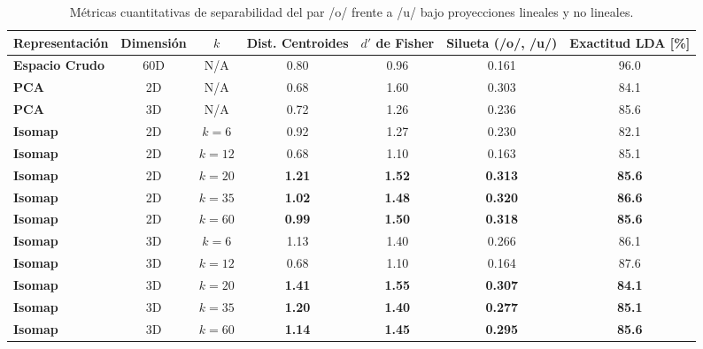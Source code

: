 \documentclass[11pt,a4paper,openany]{book}
\theoremstyle{definition}
\begin{document}
\begin{table}[H]
\centering
\small
\begin{tabular}{lcccccc}
\toprule
\textbf{Representación} & \textbf{Dimensión} & \textbf{$k$} & \textbf{Dist. Centroides} & \textbf{$d'$ de Fisher} & \textbf{Silueta (/o/, /u/)} & \textbf{Exactitud LDA [\%]} \\
\midrule
\textbf{Espacio Crudo} & 60D & N/A & 0.80 & 0.96 & 0.161 & 96.0 \\
\textbf{PCA}           & 2D  & N/A & 0.68 & 1.60 & 0.303 & 84.1 \\
\textbf{PCA}           & 3D  & N/A & 0.72 & 1.26 & 0.236 & 85.6 \\
\midrule
\textbf{Isomap}        & 2D  & $k = 6$  & 0.92 & 1.27 & 0.230 & 82.1 \\
\textbf{Isomap}        & 2D  & $k = 12$ & 0.68 & 1.10 & 0.163 & 85.1 \\
\textbf{Isomap}        & 2D  & \textbf{$k = 20$} & \textbf{1.21} & \textbf{1.52} & \textbf{0.313} & \textbf{85.6} \\
\textbf{Isomap}        & 2D  & \textbf{$k = 35$} & \textbf{1.02} & \textbf{1.48} & \textbf{0.320} & \textbf{86.6} \\
\textbf{Isomap}        & 2D  & \textbf{$k = 60$} & \textbf{0.99} & \textbf{1.50} & \textbf{0.318} & \textbf{85.6} \\
\midrule
\textbf{Isomap}        & 3D  & $k = 6$  & 1.13 & 1.40 & 0.266 & 86.1 \\
\textbf{Isomap}        & 3D  & $k = 12$ & 0.68 & 1.10 & 0.164 & 87.6 \\
\textbf{Isomap}        & 3D  & \textbf{$k = 20$} & \textbf{1.41} & \textbf{1.55} & \textbf{0.307} & \textbf{84.1} \\
\textbf{Isomap}        & 3D  & \textbf{$k = 35$} & \textbf{1.20} & \textbf{1.40} & \textbf{0.277} & \textbf{85.1} \\
\textbf{Isomap}        & 3D  & \textbf{$k = 60$} & \textbf{1.14} & \textbf{1.45} & \textbf{0.295} & \textbf{85.6} \\
\bottomrule
\end{tabular}
\caption{Métricas cuantitativas de separabilidad del par /o/ frente a /u/ bajo proyecciones lineales y no lineales.}
\label{tab:separabilidad_o_u_metricas}
\end{table}
\end{document}
